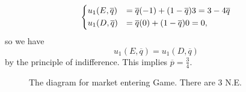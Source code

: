 \begin{itemize}
	      \[
		      \begin{dcases}
			      u_1(E, \overline{q}) & = \overline{q}( - 1)+(1-\overline{q})3 = 3 - 4 \overline{q} \\
			      u_1(D, \overline{q}) & = \overline{q}(0)+(1 - \overline{q})0 = 0,
		      \end{dcases}
	      \]
	      so we have
	      \[
		      u_1(E, \overline{q}) = u_1(D, \overline{q})
	      \]
	      by the principle of indifference. This implies \(\overline{p} = \frac{3}{4}\).
	      \begin{figure}[H]
		      \centering
		      \caption{The diagram for market entering Game. There are 3 N.E.}
		      \label{fig:NE-market-entering}
	      \end{figure}
\end{itemize}
